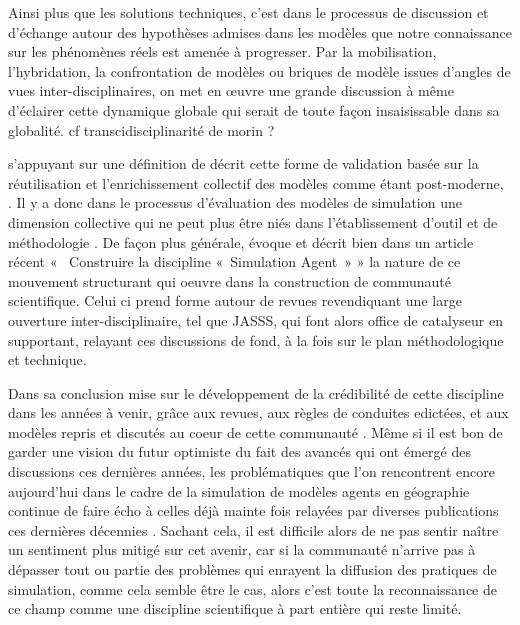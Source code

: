 
Ainsi plus que les solutions techniques, c'est dans le processus de discussion et d'échange autour des hypothèses admises dans les modèles que notre connaissance sur les phénomènes réels est amenée à progresser. Par la mobilisation, l'hybridation, la confrontation de modèles ou briques de modèle issues d'angles de vues inter-disciplinaires,  on met en œuvre une grande discussion à même d'éclairer cette dynamique globale qui serait de toute façon insaisissable dans sa globalité. {cf transcidisciplinarité de morin ?}

 \autocite{Rouchier2013} s'appuyant sur une définition de  décrit cette forme de validation basée sur la réutilisation et l'enrichissement collectif des modèles comme étant post-moderne, . Il y a donc dans le processus d'évaluation des modèles de simulation une dimension collective qui ne peut plus être niés dans l'établissement d'outil et de méthodologie . De façon plus générale, \autocite{Rouchier2013} évoque et décrit bien dans un article récent «  Construire la discipline « Simulation Agent » » la nature de ce mouvement structurant qui oeuvre dans la construction de communauté scientifique. Celui ci prend forme autour de revues revendiquant une large ouverture inter-disciplinaire, tel que JASSS, qui font alors office de catalyseur en supportant, relayant ces discussions de fond, à la fois sur le plan méthodologique et technique.

Dans sa conclusion \autocite{Rouchier2013} mise sur le développement de la crédibilité de cette discipline dans les années à venir, grâce aux revues, aux règles de conduites edictées, et aux modèles repris et discutés au coeur de cette communauté \autocite{Hales2003}. Même si il est bon de garder une vision du futur optimiste du fait des avancés qui ont émergé des discussions ces dernières années, les problématiques que l'on rencontrent encore aujourd'hui dans le cadre de la simulation de modèles agents en géographie continue de faire écho à celles déjà mainte fois relayées par diverses publications ces dernières décennies \autocite{Squazzoni2010}  \autocite{Richiardi2006} \autocite{Windrum2007}. Sachant cela, il est difficile alors de ne pas sentir naître un sentiment plus mitigé sur cet avenir, car si la communauté n'arrive pas à dépasser tout ou partie des problèmes qui enrayent la diffusion des pratiques de simulation, comme cela semble être le cas, alors c'est toute la reconnaissance de ce champ comme une discipline scientifique à part entière qui reste limité.

